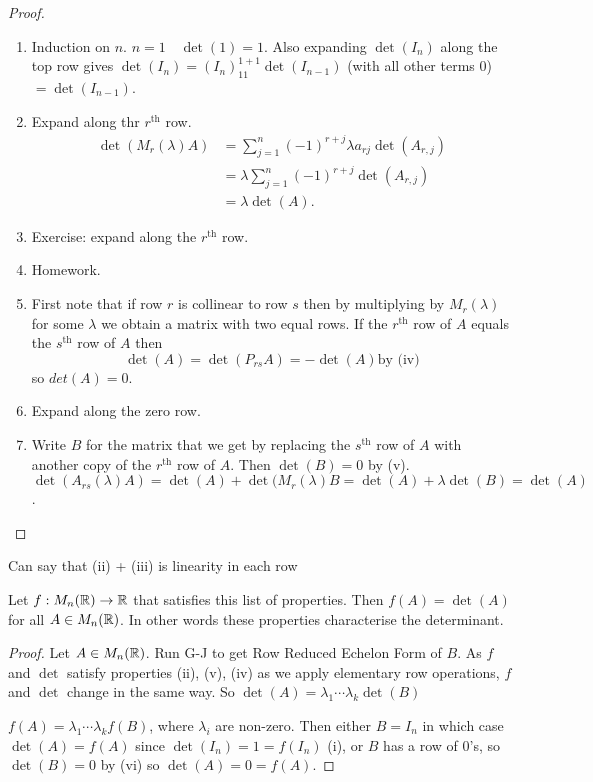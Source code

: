 \documentclass[10pt, a4paper]{article}
\begin{document}
\begin{proof}
    \begin{enumerate}[label = (\roman*)]
        \item Induction on $n$.
        $n = 1\quad\det(1) = 1$.
        Also expanding $\det(I_n)$ along the top row gives $\det(I_n) = (I_n)_{11}^{1 + 1}\det(I_{n - 1})$ (with all other terms $0$) $= \det(I_{n - 1})$.
        \item Expand along thr $r^{\text{th}}$ row.
        \begin{align*}
            \det(M_r(\lambda)A) &= \sum_{j = 1}^{n}(-1) ^ {r + j}\lambda a_{r j}\det(A_{r, j}) \\
            &= \lambda\sum_{j = 1}^{n}(-1) ^ {r + j}\det(A_{r, j}) \\
            &= \lambda\det(A).
        \end{align*}
        \item Exercise: expand along the $r^{\text{th}}$ row.
        \item Homework.
        \item First note that if row $r$ is collinear to row $s$ then by multiplying by $M_r(\lambda)$ for some $\lambda$ we obtain a matrix with two equal rows.
        If the $r^{\text{th}}$ row of $A$ equals the $s ^ {\text{th}}$ row of $A$ then
        \[
        \det(A) = \det(P_{rs}A) = -\det(A) \text{by (iv)}
        \]
        so $det(A) = 0$.
        \item Expand along the zero row.
        \item Write $B$ for the matrix that we get by replacing the $s ^ {\text{th}}$ row of $A$ with another copy of the $r ^ {\text{th}}$ row of $A$.
        Then $\det(B) = 0$ by (v).
        $\det(A_{rs}(\lambda)A) = \det(A) + \det(M_r(\lambda)B = \det(A) + \lambda\det(B) = \det(A)$.
    \end{enumerate}
\end{proof}
Can say that (ii) + (iii) is linearity in each row

\begin{theorem}
    Let $f : M_n(\mathbb{R}) \rightarrow \mathbb{R}$ that satisfies this list of properties.
    Then $f(A) = \det(A)$ for all $A \in M_n(\mathbb{R})$.
    In other words
    these properties characterise the determinant.
    \begin{proof}
        Let $A \in M_n(\mathbb{R})$.
        Run G-J to get Row Reduced Echelon Form of $B$.
        As $f$ and $\det$ satisfy properties (ii), (v), (iv) as we apply elementary row operations,
        $f$ and $\det$ change in the same way.
        So $\det(A) = \lambda_1 \dotsi \lambda_k \det(B)$
        
        $f(A) = \lambda_1 \dotsi \lambda_k f(B)$,
        where $\lambda_i$ are non-zero.
        Then either $B = I_n$ in which case $\det(A) = f(A)$ since
        $\det(I_n) = 1 = f(I_n)$ (i),
        or $B$ has a row of $0$'s,
        so $\det(B) = 0$ by (vi) so $\det(A) = 0 = f(A)$.
    \end{proof}
\end{theorem}
\end{document}

